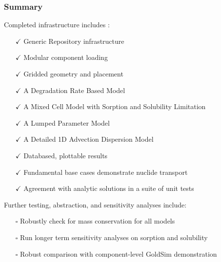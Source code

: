 \begin{frame}[ctb!]
  \frametitle{Summary}
  Completed infrastructure includes :
  \begin{itemize}
  \item[$\checkmark$] Generic Repository infrastructure 
  \item[$\checkmark$] Modular component loading
  \item[$\checkmark$] Gridded geometry and placement
  \item[$\checkmark$] A Degradation Rate Based Model
  \item[$\checkmark$] A Mixed Cell Model with Sorption and Solubility Limitation
  \item[$\checkmark$] A Lumped Parameter Model
  \item[$\checkmark$] A Detailed 1D Advection Dispersion Model
  \item[$\checkmark$] Databased, plottable results
  \item[$\checkmark$] Fundamental base cases demonstrate nuclide transport 
  \item[$\checkmark$] Agreement with analytic solutions in a suite of unit tests
  \end{itemize}
  Further testing, abstraction, and sensitivity analyses include:
  \begin{itemize}
  \item[$\square$] Robustly check for mass conservation for all models 
  \item[$\square$] Run longer term sensitivity analyses on sorption and solubility 
  \item[$\square$] Robust comparison with component-level GoldSim demonstration 
  \end{itemize}

\end{frame}

